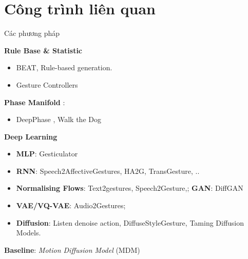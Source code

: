 \section{Công trình liên quan}

\begin{frame}{Các phương pháp}
		
	\textbf{Rule Base \& Statistic}
	\begin{itemize}
		\small
		\item BEAT, Rule-based generation.
		\item Gesture Controllers 
	\end{itemize}
	\textbf{Phase Manifold} : 
	
	\begin{itemize}
		\small
		\item  DeepPhase , Walk the Dog
	\end{itemize}
	
	\textbf{Deep Learning}
	\begin{itemize}
		\small
		\item \textbf{MLP}: Gesticulator
		\item \textbf{RNN}: Speech2AffectiveGestures, HA2G, TransGesture, .. 
		\item \textbf{Normalising Flows}: Text2gestures, Speech2Gesture,; \textbf{GAN}: DiffGAN
		\item \textbf{VAE/VQ-VAE}:  Audio2Gestures; 
		\item \textbf{Diffusion}: Listen denoise action, DiffuseStyleGesture, Taming Diffusion Models.
		
	\end{itemize}

\textbf{Baseline}: \textit{Motion Diffusion Model} (MDM)

	

\end{frame}
